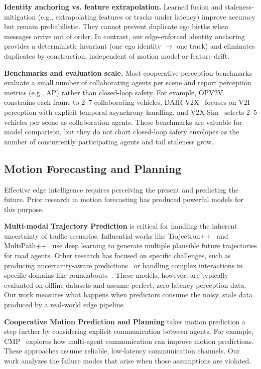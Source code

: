 \noindent\textbf{Identity anchoring vs. feature extrapolation.}
Learned fusion and staleness-mitigation (e.g., extrapolating features or tracks under latency) improve accuracy but remain probabilistic. They cannot prevent duplicate ego births when messages arrive out of order. In contrast, our edge-enforced identity anchoring provides a deterministic invariant (one ego identity $\rightarrow$ one track) and eliminates duplicates by construction, independent of motion model or feature drift.




\noindent\textbf{Benchmarks and evaluation scale.}
Most cooperative-perception benchmarks evaluate a small number of collaborating agents per scene and report perception metrics (e.g., AP) rather than closed-loop safety.
For example, OPV2V~\cite{xu2022opencood} constrains each frame to 2--7 collaborating vehicles, DAIR-V2X~\cite{DAIR-V2X} focuses on V2I perception with explicit temporal asynchrony handling, and V2X-Sim~\cite{V2xsim} selects 2--5 vehicles per scene as collaboration agents. These benchmarks are valuable for model comparison, but they do not chart closed-loop safety envelopes as the number of concurrently participating agents and tail staleness grow.


\subsection{Motion Forecasting and Planning}

Effective edge intelligence requires perceiving the present and predicting the future.  Prior research in motion forecasting has produced powerful models for this purpose.

\textbf{Multi-modal Trajectory Prediction} is critical for handling the inherent uncertainty of traffic scenarios. Influential works like Trajectron++~\cite{trajectron2020} and MultiPath++~\cite{multipath2021} use deep learning to generate multiple plausible future trajectories for road agents. Other research has focused on specific challenges, such as producing uncertainty-aware predictions~\cite{djuric2020uncertainty} or handling complex interactions in specific domains like roundabouts~\cite{li20203}. These models, however, are typically evaluated on offline datasets and assume perfect, zero-latency perception data. Our work measures what happens when predictors consume the noisy, stale data produced by a real-world edge pipeline.

\textbf{Cooperative Motion Prediction and Planning} takes motion prediction a step further by considering explicit communication between agents. For example, CMP~\cite{cmp_ieee_2023} explores how multi-agent communication can improve motion predictions. These approaches assume reliable, low-latency communication channels. Our work analyzes the failure modes that arise when those assumptions are violated.

